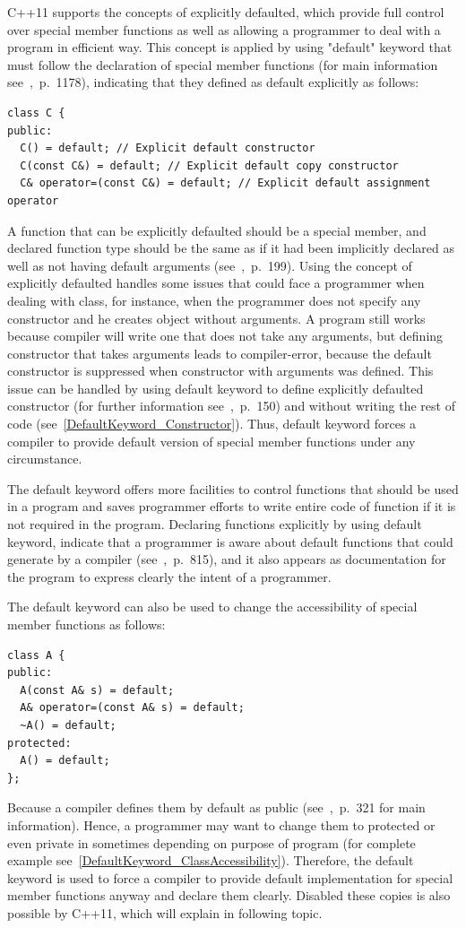 \documentclass[11pt]{report}
\begin{document}
C++11 supports the concepts of explicitly defaulted, which provide full control over special member functions as well as allowing a programmer to deal with a program in efficient way. This concept is applied by using "default" keyword that must follow the declaration of special member functions (for main information see~\cite{Prata:2012:Cpp},~p.~1178), indicating that they defined as default explicitly as follows:
\begin{lstlisting}
class C {
public:
  C() = default; // Explicit default constructor
  C(const C&) = default; // Explicit default copy constructor
  C& operator=(const C&) = default; // Explicit default assignment operator
\end{lstlisting}
A function that can be explicitly defaulted should be a special member, and declared function type should be the same as if it had been implicitly declared as well as not having default arguments (see~\cite{ISO:2011:Cpplanguage},~p.~199). Using the concept of explicitly defaulted handles some issues that could face a programmer when dealing with class, for instance, when the programmer does not specify any constructor and he creates object without arguments. A program still works because compiler will write one that does not take any arguments, but defining constructor that takes arguments leads to compiler-error, because the default constructor is suppressed when constructor with arguments was defined. This issue can be handled by using default keyword to define explicitly defaulted constructor (for further information see~\cite{Gregorie:professionalcpp},~p.~150) and without writing the rest of code (see~\ref{DefaultKeyword_Constructor}). Thus, default keyword forces a compiler to provide default version of special member functions under any circumstance.

The default keyword offers more facilities to control functions that should be used in a program and saves programmer efforts to write entire code of function if it is not required in the program. Declaring functions explicitly by using default keyword, indicate that a programmer is aware about default functions that could generate by a compiler (see~\cite{Horstmann:2008:BC},~p.~815), and it also appears as documentation for the program to express clearly the intent of a programmer.

The default keyword can also be used to change the accessibility of special member functions as follows:
\begin{lstlisting}
class A {
public:
  A(const A& s) = default;
  A& operator=(const A& s) = default;
  ~A() = default;
protected:
  A() = default;
};\end{lstlisting}
Because a compiler defines them by default as public (see~\cite{Williams:2012:CCA},~p.~321 for main information). Hence, a programmer may want to change them to protected or even private in sometimes depending on purpose of program (for complete example see~\ref{DefaultKeyword_ClassAccessibility}). Therefore, the default keyword is used to force a compiler to provide default implementation for special member functions anyway and declare them clearly. Disabled these copies is also possible by C++11, which will explain in following topic.
\end{document}
